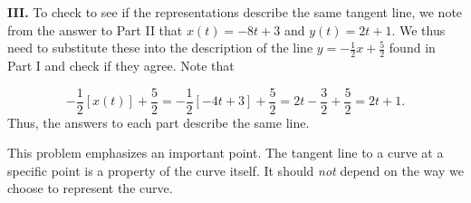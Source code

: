 \documentclass[noauthor]{ximera}
\begin{document}
\begin{problem}
\begin{freeResponse}
 \textbf{III.} To check to see if the representations describe the same tangent line, we note from the answer to Part II that $x(t) = -8t+3$ and $y(t) = 2t+1$.  We thus need to substitute these into the description of the line  $y = -\frac{1}{2}x+\frac{5}{2}$ found in Part I and check if they agree.  Note that
 
 \[
 -\frac{1}{2}[x(t)]+\frac{5}{2} =  -\frac{1}{2}[-4t+3]+\frac{5}{2} = 2t -\frac{3}{2}+\frac{5}{2} = 2t+1.
 \]
 Thus, the answers to each part describe the same line.
 
 \begin{remark}
 This problem emphasizes an important point.  The tangent line to a curve at a specific point is a property of the curve itself.  It should \emph{not} depend on the way we choose to represent the curve.
 \end{remark}
 
 \end{freeResponse}
\end{problem}

\end{document}
